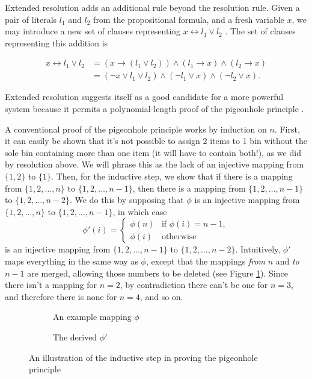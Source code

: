 \documentclass[11pt]{article}
\begin{document}

Extended resolution adds an additional rule beyond the resolution rule. Given a pair of literals $l_1$ and $l_2$ from the propositional formula, and a fresh variable $x$, we may introduce a new set of clauses representing $x \leftrightarrow l_1 \vee l_2$ \cite{Tseitin:1983}.
The set of clauses representing this addition is

\begin{equation*}
  \begin{align*}
    x \leftrightarrow l_1 \vee l_2 &= (x \to (l_1 \vee l_2)) \wedge (l_1 \to x) \wedge (l_2 \to x) \\
          &= (\neg x \vee l_1 \vee l_2) \wedge (\neg l_1 \vee x) \wedge (\neg l_2 \vee x).
  \end{align*}
\end{equation*}

Extended resolution suggests itself as a good candidate for a more powerful system because it permits a polynomial-length proof of the pigeonhole principle \cite{Cook:1976}.

A conventional proof of the pigeonhole principle works by induction on $n$. First, it can easily be shown that it's not possible to assign 2 items to 1 bin without the sole bin containing more than one item (it will have to contain both!), as we did by resolution above. We will phrase this as the lack of an injective mapping from $\{1,2\}$ to $\{1\}$. Then, for the inductive step, we show that if there is a mapping from $\{1,2,\ldots,n\}$ to $\{1,2,\ldots,n-1\}$, then there is a mapping from $\{1,2,\ldots,n-1\}$ to $\{1,2,\ldots,n-2\}$. We do this by supposing that $\phi$ is an injective mapping from $\{1,2,\ldots,n\}$ to $\{1,2,\ldots,n-1\}$, in which case
\[\phi'(i) = \begin{cases}
\phi(n) & \mbox{if } \phi(i) = n-1, \\
\phi(i) & \mbox{otherwise}
\end{cases}\]
is an injective mapping from $\{1,2,\ldots,n-1\}$ to $\{1,2,\ldots,n-2\}$. Intuitively, $\phi'$ maps everything in the same way as $\phi$, except that the mappings \emph{from} $n$ and \emph{to} $n-1$ are merged, allowing those numbers to be deleted (see Figure \ref{fig:php-induction}). Since there isn't a mapping for $n=2$, by contradiction there can't be one for $n=3$, and therefore there is none for $n=4$, and so on.

\begin{figure}[h]
  \begin{subfigure}[H]{0.5\textwidth}
    
    \caption{An example mapping $\phi$}
  \end{subfigure}
  \begin{subfigure}[H]{0.5\textwidth}
    
    \caption{The derived $\phi'$}
  \end{subfigure}
  \caption{An illustration of the inductive step in proving the pigeonhole principle}
  \label{fig:php-induction}
\end{figure}
\end{document}
